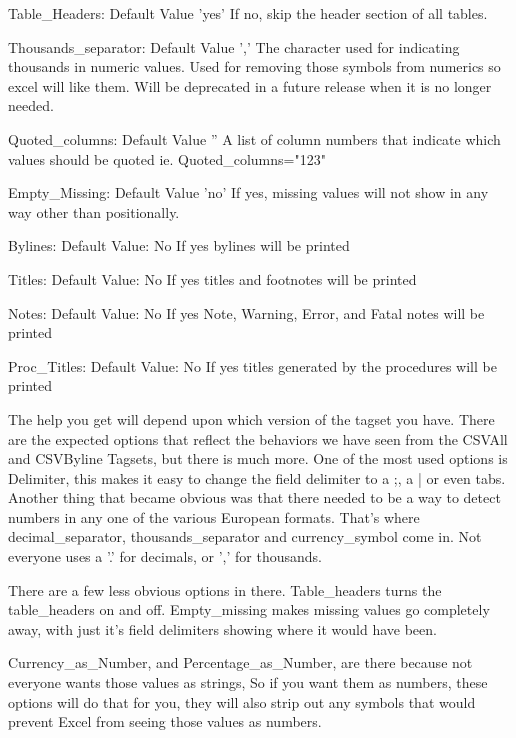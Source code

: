 \begin{sfvoutput}
Table\_Headers:   Default Value 'yes'
     If no, skip the header section of all tables.
 
Thousands\_separator:   Default Value ','
     The character used for indicating thousands in numeric values.
     Used for removing those symbols from numerics so excel will like them.
     Will be deprecated in a future release when it is no longer needed.
 
Quoted\_columns:   Default Value ''
     A list of column numbers that indicate which values should be quoted
     ie. Quoted\_columns="123"
 
Empty\_Missing:   Default Value 'no'
     If yes, missing values will not show in any way other than positionally.
 
Bylines:   Default Value: No
     If yes bylines will be printed
 
Titles:   Default Value: No
     If yes titles and footnotes will be printed
 
Notes:   Default Value: No
     If yes Note, Warning, Error, and Fatal notes will be printed
 
Proc\_Titles:   Default Value: No
     If yes titles generated by the procedures will be printed
 
\end{sfvoutput}


The help you get will depend upon which version of the tagset you have.
There are the expected options that reflect the behaviors we have seen
from the CSVAll and CSVByline Tagsets, but there is much more.  One
of the most used options is Delimiter, this makes it easy to change the
field delimiter to a ;, a | or even tabs.  Another thing that became
obvious was that there needed to be a way to detect numbers in any one
of the various European formats.  That's where decimal\_separator, thousands\_separator
and currency\_symbol come in.  Not everyone uses a '.' for decimals, or ',' for
thousands. 

There are a few less obvious options in there.  Table\_headers turns the table\_headers
on and off.  Empty\_missing makes missing values go completely away, with just it's
field delimiters showing where it would have been.  

Currency\_as\_Number, and Percentage\_as\_Number,
are there because not everyone wants those values as strings, So if you want them as numbers,
these options will do that for you, they will also strip out any symbols that would prevent
Excel from seeing those values as numbers.

